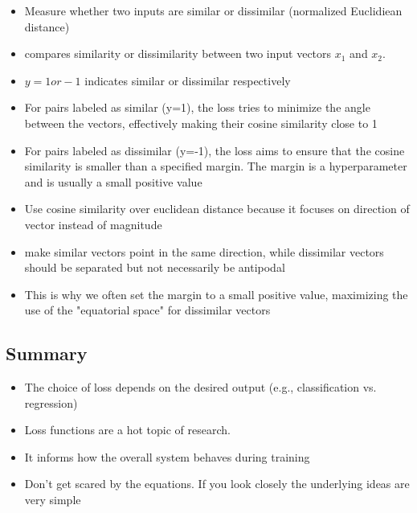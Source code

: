 \documentclass[11pt]{article}
\begin{document}
\begin{itemize}
    \item Measure whether two inputs are similar or dissimilar (normalized Euclidiean distance)
    \item compares similarity or dissimilarity between two input vectors $x_1$ and $x_2$.
    \item $y=1 or -1$ indicates similar or dissimilar respectively
    \item For pairs labeled as similar (y=1), the loss tries to minimize the angle
    between the vectors, effectively making their cosine similarity close to 1
    \item For pairs labeled as dissimilar (y=-1), the loss aims to ensure that the cosine
    similarity is smaller than a specified margin. The margin is a hyperparameter
    and is usually a small positive value
    \item Use cosine similarity over euclidean distance because it focuses on direction of vector instead of magnitude
    \item make similar vectors point in the same direction, while
    dissimilar vectors should be separated but not necessarily be antipodal
    \item This
is why we often set the margin to a small positive value, maximizing the use of
the "equatorial space" for dissimilar vectors
\end{itemize}

\subsection{Summary}

\begin{itemize}
    \item The choice of loss depends on the desired output (e.g., classification
    vs. regression)
    \item Loss functions are a hot topic of research.
    \item It informs how the overall system behaves during training
    \item Don't get scared by the equations. If you look closely the underlying
    ideas are very simple
\end{itemize}
\end{document}
